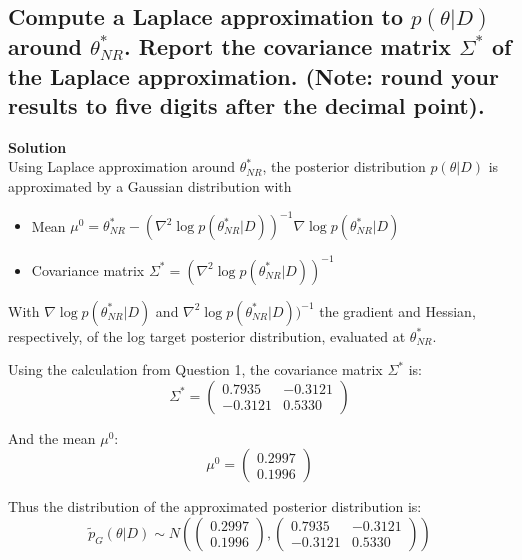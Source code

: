 \documentclass[12pt]{article}
\begin{document}
\subsection{Compute a Laplace approximation to \( p(\theta|D) \) around \( \theta^*_{NR} \). Report the covariance matrix \( \Sigma^* \) of the Laplace approximation. (Note: round your results to five digits after the decimal point).}
\textbf{Solution}\\
Using Laplace approximation around \( \theta^*_{NR} \), the posterior distribution \( p(\theta|D) \) is approximated
by a Gaussian distribution with
\begin{itemize}
    \item Mean \( \mu^{0} = \theta^*_{NR} - (\nabla^2 \log p(\theta^*_{NR}|D))^{-1} \nabla \log p(\theta^*_{NR}|D) \)
    \item Covariance matrix \( \Sigma^* = (\nabla^2 \log p(\theta^*_{NR}|D))^{-1} \)
\end{itemize}
With \( \nabla \log p(\theta^*_{NR}|D) \) and \( \nabla^2 \log p(\theta^*_{NR}|D))^{-1} \) the gradient and Hessian, respectively, of the
log target posterior distribution, evaluated at \( \theta^*_{NR} \).

Using the calculation from Question 1, the covariance matrix \( \Sigma^* \) is:
\[ \Sigma^* =
\begin{pmatrix}
0.7935 & -0.3121 \\
-0.3121 & 0.5330
\end{pmatrix}
\]

And the mean \( \mu^{0} \):
\[ \mu^{0} =
\begin{pmatrix}
0.2997 \\
0.1996
\end{pmatrix}
\]

Thus the distribution of the approximated posterior distribution is:
\[ \tilde{p}_G(\theta|D) \sim N\left(
\begin{pmatrix}
0.2997 \\
0.1996
\end{pmatrix}
,
\begin{pmatrix}
0.7935 & -0.3121 \\
-0.3121 & 0.5330
\end{pmatrix}
\right) \]
\end{document}
